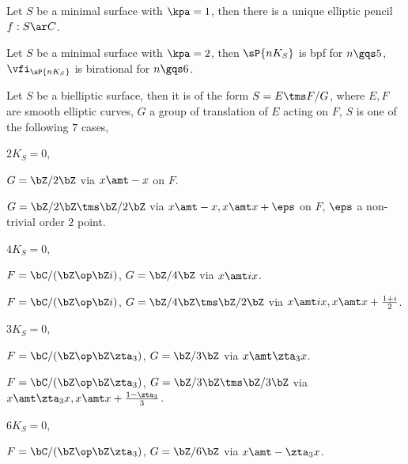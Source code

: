 \documentclass[a4paper, twoside]{article}
\begin{document}
\begin{thm}
	Let $S$ be a minimal surface with $\kpa=1$, then there is a unique elliptic pencil $f:S\ar C$.
\end{thm}


\begin{thm}
	Let $S$ be a minimal surface with $\kpa=2$, then $\sP{nK_{S}}$ is bpf for $n\gqs5$, $\vfi_{\sP{nK_{S}}}$ is birational for $n\gqs6$.
\end{thm}



\begin{thm}
	Let $S$ be a bielliptic surface, then it is of the form $S=E\tms F/G$, where $E,F$ are smooth elliptic curves, $G$ a group of translation of $E$ acting on $F$, $S$ is one of the following $7$ cases,
	\begin{enr}[label=(\arabic*)]
		\item $2K_{S}=0$,
		\begin{itm}
			\item $G=\bZ/2\bZ$ via $x\amt-x$ on $F$.
			\item $G=\bZ/2\bZ\tms\bZ/2\bZ$ via $x\amt-x, x\amt x+\eps$ on $F$, $\eps$ a non-trivial order $2$ point.
		\end{itm}
		\item $4K_{S}=0$,
		\begin{itm}
			\item $F=\bC/(\bZ\op\bZ i)$, $G=\bZ/4\bZ$ via $x\amt ix$.
			\item $F=\bC/(\bZ\op\bZ i)$, $G=\bZ/4\bZ\tms\bZ/2\bZ$ via $x\amt ix, x\amt x+\frac{1+i}{2}$.
		\end{itm}
		\item $3K_{S}=0$,
		\begin{itm}
			\item $F=\bC/(\bZ\op\bZ\zta_{3})$, $G=\bZ/3\bZ$ via $x\amt \zta_{3}x$.
			\item $F=\bC/(\bZ\op\bZ\zta_{3})$, $G=\bZ/3\bZ\tms\bZ/3\bZ$ via $x\amt \zta_{3}x, x\amt x+\frac{1-\zta_{3}}{3}$.
		\end{itm}
		\item $6K_{S}=0$,
		\begin{itm}
			\item $F=\bC/(\bZ\op\bZ\zta_{3})$, $G=\bZ/6\bZ$ via $x\amt -\zta_{3}x$.
		\end{itm}
	\end{enr}
\end{thm}
\end{document}
